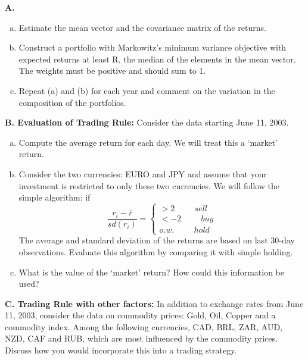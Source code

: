 \indent\textbf{A. }\begin{minipage}[t]{0.8\linewidth}
	\begin{enumerate}[(a)]
	\item Estimate the mean vector and the covariance matrix of the returns.
	\item Construct a portfolio with Markowitz's minimum variance objective with expected returns at least R, the median of the elements in the mean vector. The weights must be positive and should sum to 1.
	\item Repeat (a) and (b) for each year and comment on the variation in the composition of the portfolios. \\
	\end{enumerate}
	\end{minipage}

\indent\textbf{B. Evaluation of Trading Rule:} Consider the data starting June 11, 2003.
	\begin{enumerate}[(a)]
	\item Compute the average return for each day. We will treat this a `market' return.
	\item Consider the two currencies: EURO and JPY and assume that your investment is restricted to only these two currencies. We will follow the simple algorithm: if 
	\[
	\frac{r_i - \overline{r}}{sd(r_i)}=\left\{
	\begin{aligned}
	> 2 \hspace{1cm}sell \\
	< -2 \hspace{1cm}buy \\
	o.w. \hspace{1cm}hold
	\end{aligned} \right.
	\]
The average and standard deviation of the returns are based on last 30-day observations. Evaluate this algorithm by comparing it with simple holding.
	\item What is the value of the `market' return? How could this information be used?
\end{enumerate}


\textbf{C. Trading Rule with other factors:} In addition to exchange rates from June 11, 2003, consider the data on commodity prices: Gold, Oil, Copper and a commodity index. Among the following currencies, CAD, BRL, ZAR, AUD, NZD, CAF and RUB, which are most influenced by the commodity prices. Discuss how you would incorporate this into a trading strategy. \\


